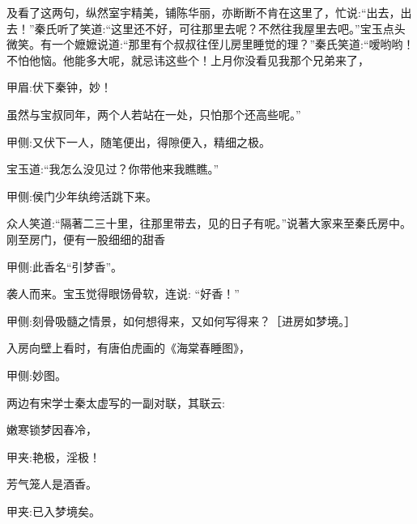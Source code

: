 \begin{parag}
    及看了这两句，纵然室宇精美，铺陈华丽，亦断断不肯在这里了，忙说:“出去，出去！”秦氏听了笑道:“这里还不好，可往那里去呢？不然往我屋里去吧。”宝玉点头微笑。有一个嬷嬷说道:“那里有个叔叔往侄儿房里睡觉的理？”秦氏笑道:“嗳哟哟！不怕他恼。他能多大呢，就忌讳这些个！上月你没看见我那个兄弟来了，\begin{note}甲眉:伏下秦钟，妙！\end{note}虽然与宝叔同年，两个人若站在一处，只怕那个还高些呢。”\begin{note}甲侧:又伏下一人，随笔便出，得隙便入，精细之极。\end{note}宝玉道:“我怎么没见过？你带他来我瞧瞧。”\begin{note}甲侧:侯门少年纨绔活跳下来。\end{note}众人笑道:“隔著二三十里，往那里带去，见的日子有呢。”说著大家来至秦氏房中。刚至房门，便有一股细细的甜香\begin{note}甲侧:此香名“引梦香”。\end{note}袭人而来。宝玉觉得眼饧骨软，连说: “好香！”\begin{note}甲侧:刻骨吸髓之情景，如何想得来，又如何写得来？［进房如梦境。］\end{note}入房向壁上看时，有唐伯虎画的《海棠春睡图》，\begin{note}甲侧:妙图。\end{note}两边有宋学士秦太虚写的一副对联，其联云:
\end{parag}


\begin{poem}
    \begin{pl}嫩寒锁梦因春冷，\end{pl}
    \begin{note}甲夹:艳极，淫极！\end{note}

    \begin{pl}芳气笼人是酒香。\end{pl}
    \begin{note}甲夹:已入梦境矣。\end{note}

\end{poem}


